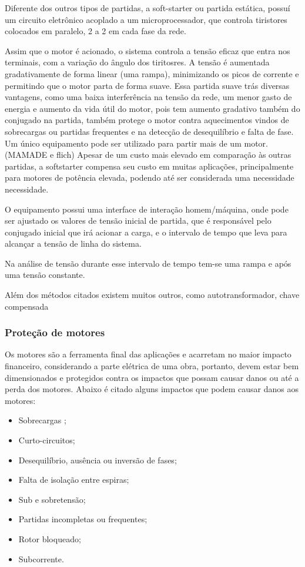Diferente dos outros tipos de partidas, a soft-starter ou partida estática, possuí um circuito eletrônico acoplado a um
microprocessador, que controla tiristores colocados em paralelo, 2 a 2 em cada fase da rede.

Assim que o motor é acionado, o sistema controla a tensão eficaz que entra nos terminais, com a variação do ângulo dos tiritosres. A tensão é aumentada gradativamente de forma linear (uma rampa), minimizando os picos de corrente e permitindo que o motor parta de forma suave. 
Essa partida suave trás diversas vantagens, como uma baixa interferência na tensão da rede, um menor gasto de energia e aumento da vida útil do motor, pois tem aumento gradativo também do conjugado na partida, também protege o motor contra aquecimentos vindos de sobrecargas ou partidas frequentes e na  detecção de desequilíbrio e falta de fase. Um único equipamento pode ser utilizado para partir mais de um motor.  (MAMADE e flich) %
Apesar de um custo mais elevado em comparação às outras partidas, a softstarter compensa seu custo em muitas aplicações, principalmente para motores de potência elevada, podendo até ser considerada uma necessidade necessidade.

O equipamento possui uma interface de interação homem/máquina, onde pode ser ajustado os valores de tensão inicial de partida, que é responsável pelo conjugado inicial que irá acionar a carga, e o intervalo de tempo que leva para alcançar a tensão de linha do sistema.



Na análise de tensão durante esse intervalo de tempo tem-se uma rampa e após uma tensão constante.


Além dos métodos citados existem muitos outros, como autotransformador, chave compensada %

\subsubsection{Proteção de motores}
Os motores são a ferramenta final das aplicações e acarretam no maior impacto financeiro, considerando a parte elétrica de uma obra, portanto, devem estar bem dimensionados e protegidos contra os impactos que possam causar danos ou até a perda dos motores. Abaixo é citado alguns impactos que podem causar danos aos motores:  
\begin{itemize}
\item Sobrecargas ;
\item Curto-circuitos;
\item Desequilíbrio, ausência ou inversão de fases;
\item Falta de isolação entre espiras;
\item Sub e sobretensão;
\item Partidas incompletas ou frequentes;
\item Rotor bloqueado;
\item Subcorrente. 
\end{itemize}


